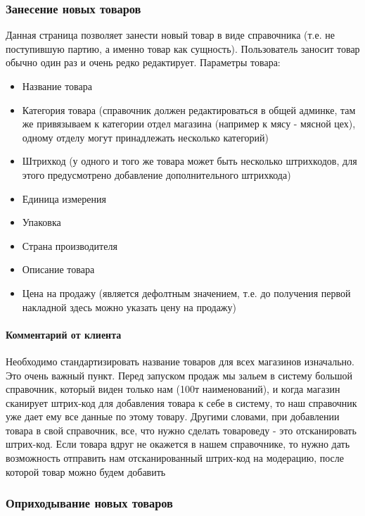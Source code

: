 \documentclass[DIV=calc, paper=a4, fontsize=11pt]{scrartcl} %
\begin{document}
\subsubsection{Занесение новых товаров} \label{subsubsec:new_goods}

Данная страница позволяет занести новый товар в виде справочника (т.е. не поступившую партию, а именно товар как сущность). Пользователь заносит товар обычно один раз и очень редко редактирует. Параметры товара:
\begin{itemize}
	\item Название товара
	\item Категория товара (справочник должен редактироваться в общей админке, там же привязываем к категории отдел магазина (например к мясу - мясной цех), одному отделу могут принадлежать несколько категорий) \label{subsec:newgoods}
	\item Штрихкод (у одного и того же товара может быть несколько штрихкодов, для этого предусмотрено добавление дополнительного штрихкода)
	\item Единица измерения
	\item Упаковка
	\item Страна производителя
	\item Описание товара
	\item Цена на продажу (является дефолтным значением, т.е. до получения первой накладной здесь можно указать цену на продажу)
\end{itemize}

\begin{framed}
\paragraph{Комментарий от клиента}
	Необходимо стандартизировать название товаров для всех магазинов изначально. Это очень важный пункт. Перед запуском продаж мы зальем в систему большой справочник, который виден только нам (100т наименований), и когда магазин сканирует штрих-код для добавления товара к себе в систему, то наш справочник уже дает ему все данные по этому товару. Другими словами, при добавлении товара в свой справочник, все, что нужно сделать товароведу - это отсканировать штрих-код. Если товара вдруг не окажется в нашем справочнике, то нужно дать возможность отправить нам отсканированный штрих-код на модерацию, после которой товар можно будем добавить
\end{framed}


\subsubsection{Оприходывание новых товаров}
\end{document}

